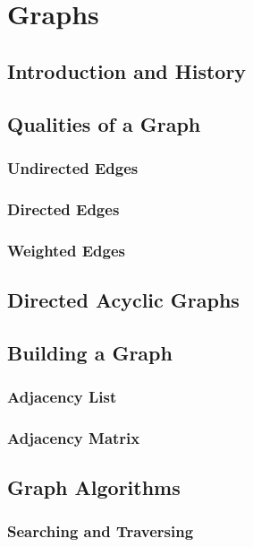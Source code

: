 \documentclass[10pt,a4paper]{book}
\begin{document}
\chapter{Graphs}
\section{Introduction and History}


\section{Qualities of a Graph}

\subsection{Undirected Edges}

\subsection{Directed Edges}

\subsection{Weighted Edges}

\section{Directed Acyclic Graphs}


\section{Building a Graph}

\subsection{Adjacency List}
\subsection{Adjacency Matrix}


\section{Graph Algorithms}

\subsection{Searching and Traversing}
\end{document}
